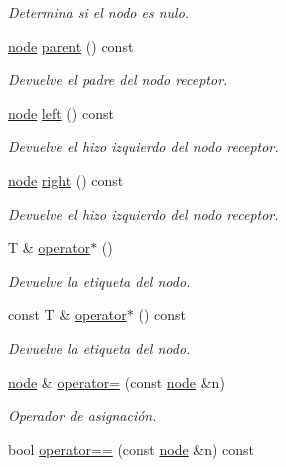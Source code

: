 \begin{DoxyCompactItemize}
\begin{DoxyCompactList}\small\item\em Determina si el nodo es nulo. \end{DoxyCompactList}\item 
\hyperlink{classbintree_1_1node}{node} \hyperlink{classbintree_1_1node_a80dcb652629eb3bf8ca0324fba3d0c44}{parent} () const 
\begin{DoxyCompactList}\small\item\em Devuelve el padre del nodo receptor. \end{DoxyCompactList}\item 
\hyperlink{classbintree_1_1node}{node} \hyperlink{classbintree_1_1node_a6d36020aec3f8526ad0e73279d1498a7}{left} () const 
\begin{DoxyCompactList}\small\item\em Devuelve el hizo izquierdo del nodo receptor. \end{DoxyCompactList}\item 
\hyperlink{classbintree_1_1node}{node} \hyperlink{classbintree_1_1node_ab9cd6a180d5cec31b104cd453a5b6233}{right} () const 
\begin{DoxyCompactList}\small\item\em Devuelve el hizo izquierdo del nodo receptor. \end{DoxyCompactList}\item 
T \& \hyperlink{classbintree_1_1node_ae3b25e1d16c449a3c0e211cd0ebe5739}{operator$\ast$} ()
\begin{DoxyCompactList}\small\item\em Devuelve la etiqueta del nodo. \end{DoxyCompactList}\item 
const T \& \hyperlink{classbintree_1_1node_acd531b6203b5c3d241c9da77cf54fc31}{operator$\ast$} () const 
\begin{DoxyCompactList}\small\item\em Devuelve la etiqueta del nodo. \end{DoxyCompactList}\item 
\hyperlink{classbintree_1_1node}{node} \& \hyperlink{classbintree_1_1node_a184f20617c0324caa3f66e4dce1338e5}{operator=} (const \hyperlink{classbintree_1_1node}{node} \&n)
\begin{DoxyCompactList}\small\item\em Operador de asignación. \end{DoxyCompactList}\item 
bool \hyperlink{classbintree_1_1node_ab1dd1b2d59b615f92850e5f8675fb141}{operator==} (const \hyperlink{classbintree_1_1node}{node} \&n) const 

\end{DoxyCompactItemize}
